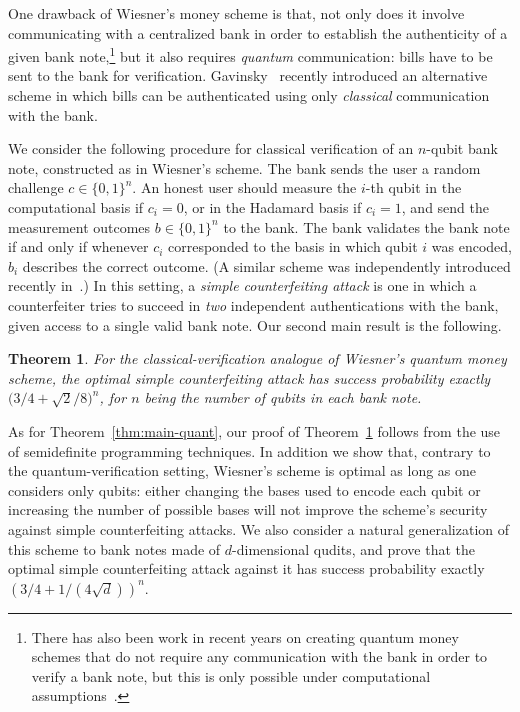 \documentclass[11pt,letterpaper]{article}
\newtheorem{theorem}{Theorem}
\theoremstyle{definition}
\begin{document}
\medskip

One drawback of Wiesner's money scheme is that, not only does it
involve communicating with a centralized bank in order to establish
the authenticity of a given bank note,\footnote{%
  There has also been work in recent years on creating quantum money
  schemes that do not require any communication with the bank in order
  to verify a bank note, but this is only possible under computational
  assumptions~\cite{FarhiGHLS10,LAFGHKS09,Aar09}.}
but it also requires \emph{quantum} communication: bills have to be
sent to the bank for verification.
Gavinsky~\cite{Gav11} recently introduced an alternative scheme in
which bills can be authenticated using only \emph{classical}
communication with the bank.

We consider the following procedure for classical verification of an
$n$-qubit bank note, constructed as in Wiesner's scheme. 
The bank sends the user a random challenge $c\in\{0,1\}^n$.
An honest user should measure the $i$-th qubit in the computational
basis if $c_i=0$, or in the Hadamard basis if $c_i=1$, and send the
measurement outcomes $b\in\{0,1\}^n$ to the bank. 
The bank validates the bank note if and only if whenever $c_i$
corresponded to the basis in which qubit $i$ was encoded, $b_i$
describes the correct outcome.
(A similar scheme was independently introduced recently
in~\cite{PYJLC11}.) 
In this setting, a \emph{simple counterfeiting attack} is one in which a
counterfeiter tries to succeed in \emph{two} independent
authentications with the bank, given access to a single valid bank
note.
Our second main result is the following.

\begin{theorem}\label{thm:main-class}
  For the classical-verification analogue of Wiesner's quantum money
  scheme, the optimal simple counterfeiting attack has success
  probability exactly  $\big(3/4+\sqrt{2}/8\big)^n$, for $n$ being the
  number of qubits in each bank note. 
\end{theorem} 

\noindent
As for Theorem~\ref{thm:main-quant}, our proof of Theorem~\ref{thm:main-class}
follows from the use of semidefinite programming techniques.
In addition we show that, contrary to the quantum-verification
setting, Wiesner's scheme is optimal as long as one considers only
qubits: either changing the bases used to encode each qubit or
increasing the number of possible bases will not improve the scheme's
security against simple counterfeiting attacks.
We also consider a natural generalization of this scheme to bank notes
made of $d$-dimensional qudits, and prove that the optimal simple
counterfeiting attack against it has success probability
exactly $(3/4+1/(4\sqrt{d}))^n$. 
\end{document}
